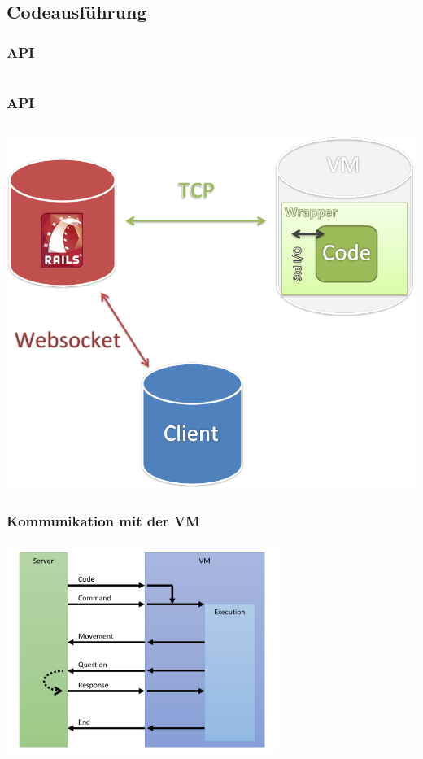 \subsection{Codeausführung}

\begin{frame}
\frametitle{API}
\inputminted[linenos, numbersep=2pt, tabsize=4, frame=lines, label=move]{ruby}{vm/move.rb}
\end{frame}

\begin{frame}
\frametitle{API}
\inputminted[linenos, numbersep=2pt, tabsize=4, frame=lines, label=look]{ruby}{vm/look.rb}
\end{frame}

\begin{frame}
\begin{center}
	\includegraphics[scale=0.35]{overview}
\end{center}
\end{frame}

\begin{frame}
\frametitle{Kommunikation mit der VM}
\begin{center}
\includegraphics[width=250pt]{vm/vm.pdf}
\end{center}
\end{frame}